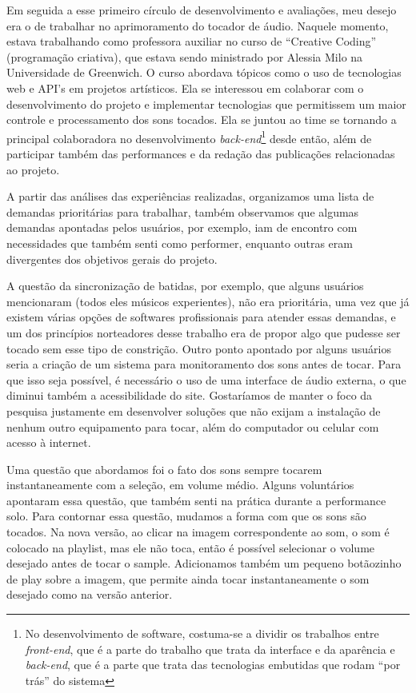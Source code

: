 Em seguida a esse primeiro círculo de desenvolvimento e avaliações, meu desejo era o de trabalhar no aprimoramento do tocador de áudio. Naquele momento, estava trabalhando como professora auxiliar no curso de ``Creative Coding'' (programação criativa), que estava sendo ministrado por Alessia Milo na Universidade de Greenwich. O curso abordava tópicos como o uso de tecnologias web e API's em projetos artísticos. Ela se interessou em colaborar com o desenvolvimento do projeto e implementar tecnologias que permitissem um maior controle e processamento dos sons tocados. Ela se juntou ao time se tornando a principal colaboradora no desenvolvimento \emph{back-end}\footnote{No desenvolvimento de software, costuma-se a dividir os trabalhos entre \emph{front-end}, que é a parte do trabalho que trata da interface e da aparência e \emph{back-end}, que é a parte que trata das tecnologias embutidas que rodam ``por trás'' do sistema} desde então, além de participar também das performances e da redação das publicações relacionadas ao projeto. 

 A partir das análises das experiências realizadas, organizamos uma lista de demandas prioritárias para trabalhar, também observamos que algumas demandas apontadas pelos usuários, por exemplo, iam de encontro com necessidades que também senti como performer, enquanto outras eram divergentes dos objetivos gerais do projeto.

 A questão da sincronização de batidas, por exemplo, que alguns usuários mencionaram (todos eles músicos experientes), não era prioritária, uma vez que já existem várias opções de softwares profissionais para atender essas demandas, e um dos princípios norteadores desse trabalho era de propor algo que pudesse ser tocado sem esse tipo de constrição. Outro ponto apontado por alguns usuários seria a criação de um sistema para monitoramento dos sons antes de tocar. Para que isso seja possível, é necessário o uso de uma interface de áudio externa, o que diminui também a acessibilidade do site. Gostaríamos de manter o foco da pesquisa justamente em desenvolver soluções que não exijam a instalação de nenhum outro equipamento para tocar, além do computador ou celular com acesso à internet. 

 Uma questão que abordamos foi o fato dos sons sempre tocarem instantaneamente com a seleção, em volume médio. Alguns voluntários apontaram essa questão, que também senti na prática durante a performance solo. Para contornar essa questão, mudamos a forma com que os sons são tocados. Na nova versão, ao clicar na imagem correspondente ao som, o som é colocado na playlist, mas ele não toca, então é possível selecionar o volume desejado antes de tocar o sample. Adicionamos também um pequeno botãozinho de play sobre a imagem, que permite ainda tocar instantaneamente o som desejado como na versão anterior.

